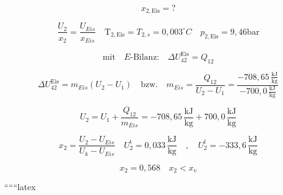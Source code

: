 \[
x_{2, \text{Eis}} = ?
\]

\[
\frac{U_{2}}{x_{2}} = \frac{U_{Eis}}{x_{Eis}} \quad \text{T}_{2, \text{Eis}} = T_{2, s} = 0,003^\circ C \quad p_{2, \text{Eis}} = 9,46 \text{bar}
\]

\[
\text{mit} \quad E\text{-Bilanz:} \quad \Delta U_{42}^{\text{Eis}} = Q_{12}
\]

\[
\Delta U_{42}^{\text{Eis}} = m_{Eis} (U_{2} - U_{1}) \quad \text{bzw.} \quad m_{Eis} = \frac{Q_{12}}{U_{2} - U_{1}} = \frac{-708,65 \, \frac{\text{kJ}}{\text{kg}}}{-700,0 \, \frac{\text{kJ}}{\text{kg}}}
\]

\[
U_{2} = U_{1} + \frac{Q_{12}}{m_{Eis}} = -708,65 \, \frac{\text{kJ}}{\text{kg}} + 700,0 \, \frac{\text{kJ}}{\text{kg}}
\]

\[
x_{2} = \frac{U_{2} - U_{Eis}}{U_{k} - U_{Eis}} \quad U_{2}^{\text{t}} = 0,033 \, \frac{\text{kJ}}{\text{kg}} \quad , \quad U_{2}^{\text{f}} = -333,6 \, \frac{\text{kJ}}{\text{kg}}
\]

\[
x_{2} = 0,568 \quad x_{2} < x_{v}
\]

``````latex


